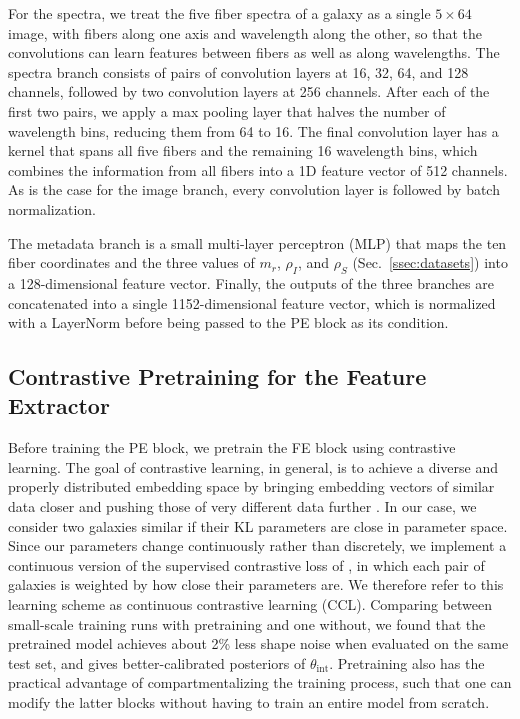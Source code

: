 For the spectra, we treat the five fiber spectra of a galaxy as a single $5\times64$ image, with fibers along one axis and wavelength along the other, so that the convolutions can learn features between fibers as well as along wavelengths. The spectra branch consists of pairs of convolution layers at 16, 32, 64, and 128 channels, followed by two convolution layers at 256 channels. After each of the first two pairs, we apply a max pooling layer that halves the number of wavelength bins, reducing them from 64 to 16. The final convolution layer has a kernel that spans all five fibers and the remaining 16 wavelength bins, which combines the information from all fibers into a 1D feature vector of 512 channels. As is the case for the image branch, every convolution layer is followed by batch normalization.

The metadata branch is a small multi-layer perceptron (MLP) that maps the ten fiber coordinates and the three values of $m_r$, $\rho_I$, and $\rho_S$ (Sec.~\ref{ssec:datasets}) into a 128-dimensional feature vector. Finally, the outputs of the three branches are concatenated into a single 1152-dimensional feature vector, which is normalized with a LayerNorm before being passed to the PE block as its condition.

\subsection{Contrastive Pretraining for the Feature Extractor}
\label{ssec:pretrain}
Before training the PE block, we pretrain the FE block using contrastive learning. The goal of contrastive learning, in general, is to achieve a diverse and properly distributed embedding space by bringing embedding vectors of similar data closer and pushing those of very different data further \citep{SimCLR, SupCon}. In our case, we consider two galaxies similar if their KL parameters are close in parameter space. Since our parameters change continuously rather than discretely, we implement a continuous version of the supervised contrastive loss of \citep{SupCon}, in which each pair of galaxies is weighted by how close their parameters are. We therefore refer to this learning scheme as continuous contrastive learning (CCL). Comparing between small-scale training runs with pretraining and one without, we found that the pretrained model achieves about 2\% less shape noise when evaluated on the same test set, and gives better-calibrated posteriors of $\theta_\mathrm{int}$. Pretraining also has the practical advantage of compartmentalizing the training process, such that one can modify the latter blocks without having to train an entire model from scratch.

